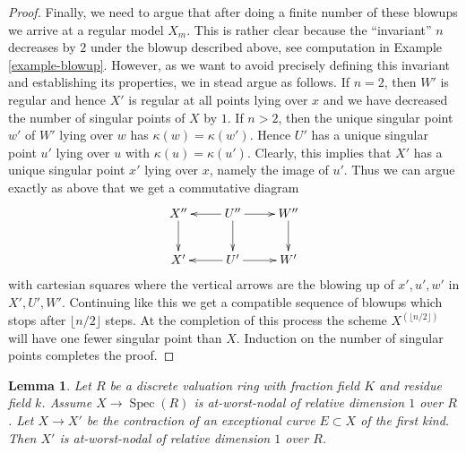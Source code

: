 \documentclass{stacks-project}
\theoremstyle{plain}
\newtheorem{lemma}[subsection]{Lemma}
\theoremstyle{definition}
\theoremstyle{remark}
\numberwithin{equation}{subsection}
\def\Spec{\mathop{\mathrm{Spec}}}
\begin{document}
\begin{proof}
\medskip\noindent
Finally, we need to argue that after doing a finite number
of these blowups we arrive at a regular model $X_m$.
This is rather clear because the ``invariant'' $n$ decreases by $2$
under the blowup described above, see computation in
Example \ref{example-blowup}.
However, as we want to avoid precisely defining this invariant
and establishing its properties, we in stead argue as follows.
If $n = 2$, then $W'$ is regular and hence $X'$
is regular at all points lying over $x$ and we have
decreased the number of singular points of $X$ by $1$.
If $n > 2$, then the unique singular point $w'$ of $W'$ lying over $w$
has $\kappa(w) = \kappa(w')$. Hence $U'$ has a unique
singular point $u'$ lying over $u$ with $\kappa(u) = \kappa(u')$.
Clearly, this implies that $X'$ has a unique singular point $x'$
lying over $x$, namely the image of $u'$. Thus we can
argue exactly as above that we get a commutative diagram
$$
\xymatrix{
X'' \ar[d] &
U'' \ar[l] \ar[d] \ar[r] &
W'' \ar[d] \\
X' & U' \ar[l] \ar[r] & W'
}
$$
with cartesian squares where the vertical arrows are the blowing
up of $x', u', w'$ in $X', U', W'$. Continuing like this we get
a compatible sequence of blowups which stops after
$\lfloor n/2 \rfloor$ steps. At the completion of this process
the scheme $X^{(\lfloor n/2 \rfloor)}$ will have one fewer
singular point than $X$. Induction on the number of singular
points completes the proof.
\end{proof}

\begin{lemma}
\label{lemma-blowdown-at-worst-nodal}
Let $R$ be a discrete valuation ring with fraction field $K$
and residue field $k$. Assume $X \to \Spec(R)$ is
at-worst-nodal of relative dimension $1$ over $R$.
Let $X \to X'$ be the contraction of an
exceptional curve $E \subset X$ of the first kind.
Then $X'$ is at-worst-nodal of relative dimension $1$ over $R$.
\end{lemma}
\end{document}
